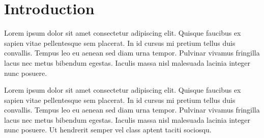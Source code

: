 \documentclass[sigconf,nonacm]{acmart} %
\begin{document}



\maketitle


\section{Introduction}
\label{sec:introduction}

Lorem ipsum dolor sit amet consectetur adipiscing elit.
Quisque faucibus ex sapien vitae pellentesque sem placerat. 
In id cursus mi pretium tellus duis convallis.
Tempus leo eu aenean sed diam urna tempor. 
Pulvinar vivamus fringilla lacus nec metus bibendum egestas.
Iaculis massa nisl malesuada lacinia integer nunc posuere. 

Lorem ipsum dolor sit amet consectetur adipiscing elit. 
Quisque faucibus ex sapien vitae pellentesque sem placerat.
In id cursus mi pretium tellus duis convallis. 
Tempus leo eu aenean sed diam urna tempor.
Pulvinar vivamus fringilla lacus nec metus bibendum egestas. 
Iaculis massa nisl malesuada lacinia integer nunc posuere.
Ut hendrerit semper vel class aptent taciti sociosqu. 
\end{document}
